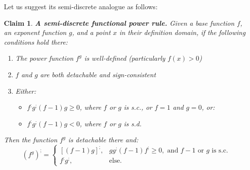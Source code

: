 \documentclass[11pt]{book}
\newtheorem{clm}[thm]{Claim}
\begin{document}
Let us suggest its semi-discrete analogue as follows:
\begin{clm}\textbf{A semi-discrete functional power rule.} Given a base function $f$, an exponent function $g$, and a point $x$ in their definition domain, if the following conditions hold there:

\begin{enumerate}
\item The power function $f^{g}$ is well-defined (particularly $f\left(x\right)>0$)
\item $f$ and $g$ are both detachable and sign-consistent
\item Either:
\begin{itemize}
\item $f^{;}g^{;}\left(f-1\right)g\geq0$, where $f$ or $g$ is s.c., or $f=1$ and $g=0$, or:
\item $f^{;}g^{;}\left(f-1\right)g<0$, where $f$ or $g$ is s.d.
\end{itemize}
\label{functional_power_rule_detachment}
\end{enumerate}

Then the function $f^{g}$ is detachable there and:
$$\left(f^{g}\right)^{;}=\begin{cases}
\left[\left(f-1\right)g\right]^{;}, & gg^{;}\left(f-1\right)f^{;}\geq0,\text{ and }f-1\text{ or }g\text{ is s.c.}\\
f^{;}g^{;}, & \text{else.}
\end{cases}$$
\end{clm}
\end{document}
